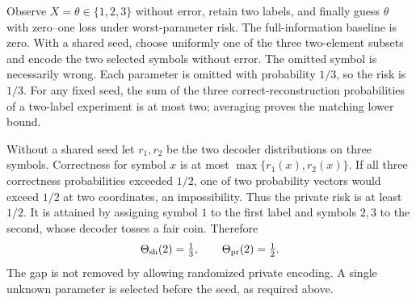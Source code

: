 \begin{example}\label{ex:v9-privategap}
Observe $X=\theta\in\{1,2,3\}$ without error, retain two labels, and
finally guess $\theta$ with zero--one loss under worst-parameter risk.
The full-information baseline is zero. With a shared seed, choose
uniformly one of the three two-element subsets and encode the two
selected symbols without error. The omitted symbol is necessarily
wrong. Each parameter is omitted with probability $1/3$, so the risk is
$1/3$. For any fixed seed, the sum of the three correct-reconstruction
probabilities of a two-label experiment is at most two; averaging proves
the matching lower bound.

Without a shared seed let $r_1,r_2$ be the two decoder distributions on
three symbols. Correctness for symbol $x$ is at most
$\max\{r_1(x),r_2(x)\}$. If all three correctness probabilities exceeded
$1/2$, one of two probability vectors would exceed $1/2$ at two
coordinates, an impossibility. Thus the private risk is at least $1/2$.
It is attained by assigning symbol $1$ to the first label and symbols
$2,3$ to the second, whose decoder tosses a fair coin. Therefore
\[
                  \Theta_{\rm sh}(2)=\tfrac13,
             \qquad\Theta_{\rm pr}(2)=\tfrac12.
\]
The gap is not removed by allowing randomized private encoding. A
single unknown parameter is selected before the seed, as required above.
\end{example}
